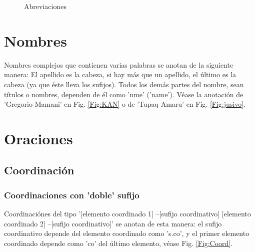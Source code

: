 \documentclass[a4paper,11pt,DIV12]{scrartcl}
\begin{document}
\begin{figure}
\begin{center}
 \caption{Abreviaciones}\label{Fig:abbrev}
\end{center}
\end{figure}

\section{Nombres}

Nombres complejos que contienen varias palabras se anotan de la siguiente manera: El apellido es la cabeza, si hay m\'as que un apellido, el \'ultimo es la cabeza (ya que \'este lleva los sufijos). Todos los dem\'as partes del nombre, sean t\'itulos o nombres, dependen de \'el como 'nme' ('name'). V\'ease la anotaci\'on de 'Gregorio Mamani' en Fig. \ref{Fig:KAN} o de 'Tupaq Amaru' en Fig. \ref{Fig:jusivo}.


\section{Oraciones}\label{Sec:oraciones}
\subsection{Coordinaci\'on}\label{Sec:coord}

\subsubsection{Coordinaciones con 'doble' sufijo}\label{Sec:coorddoble}
Coordinaci\'ones del tipo '[elemento coordinado 1] --[sufijo coordinativo] [elemento coordinado 2] --[sufijo coordinativo]'  se anotan de esta manera: el sufijo coordinativo depende del elemento coordinado como 's.co', y el primer elemento coordinado depende como 'co' del \'ultimo elemento, v\'ease Fig. \ref{Fig:Coord}. 
\end{document}
